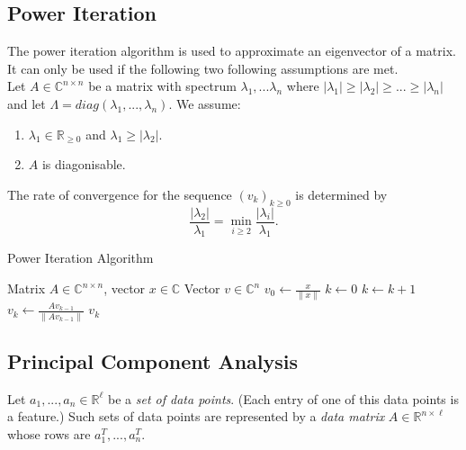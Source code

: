 \documentclass[english]{panikzettel}
\begin{document}
\subsection{Power Iteration}
\begin{halfboxl}
\vspace{-\baselineskip}
  The power iteration algorithm is used to approximate an eigenvector of a matrix. It can only be used if the following two following assumptions are met.\\
  Let $A\in\mathbb{C}^{n\times n}$ be a matrix with spectrum $\lambda_1,...\lambda_n$ where $|\lambda_1|\geq |\lambda_2|\geq ... \geq |\lambda_n|$ and let $\Lambda = diag(\lambda_1,...,\lambda_n)$. We assume:
  \begin{enumerate}
  \item $\lambda_1\in\mathbb{R}_{\geq 0}$ and $\lambda_1\geq |\lambda_2|$.
  \item $A$ is diagonisable.
  \end{enumerate}

	The rate of convergence for the sequence $(v_k)_{k\geq 0}$ is determined by
	\[
	\frac{|\lambda_2|}{\lambda_1}=\min_{i\geq 2}\frac{|\lambda_i|}{\lambda_1}.
	\]
\end{halfboxl}
\begin{halfboxr}
\vspace{-\baselineskip}
\begin{algo}{Power Iteration Algorithm}
{
\renewcommand{\algorithmicrequire}{\textbf{Input:}}%
\renewcommand{\algorithmicensure}{\textbf{Output:}}%
  \begin{algorithmic}[1]
  \Require Matrix $A\in\mathbb{C}^{n\times n}$, vector $x\in\mathbb{C}$
  \Ensure Vector $v\in\mathbb{C}^n$
  \State $v_0\leftarrow\frac{x}{\parallel x \parallel}$
  \State $k\leftarrow 0$
  \Repeat
    \State $k\leftarrow k+1$
    \State $v_k\leftarrow \frac{Av_{k-1}}{\parallel Av_{k-1} \parallel}$
  \State \Return $v_k$
  \end{algorithmic}
}
\end{algo}
\end{halfboxr}




\subsection{Principal Component Analysis}
Let $a_1,...,a_n \in \mathbb{R}^\ell$ be a \emph{set of data points}. (Each entry of one of this data points is a feature.) Such sets of data points are represented by a \emph{data matrix} $A \in \mathbb{R}^{n\times \ell}$ whose rows are $a_1^T,...,a_n^T$.
\end{document}
